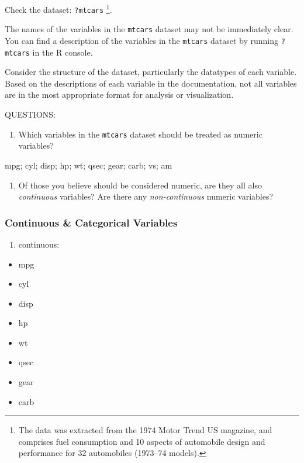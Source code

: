 \documentclass[
  man,
  floatsintext,
  longtable,
  nolmodern,
  notxfonts,
  notimes,
  colorlinks=true,linkcolor=blue,citecolor=blue,urlcolor=blue]{apa7}
\providecommand{\tightlist}{%
  \setlength{\itemsep}{0pt}\setlength{\parskip}{0pt}}
\begin{document}
Check the dataset: \texttt{?mtcars} \footnote{The data was extracted
  from the 1974 Motor Trend US magazine, and comprises fuel consumption
  and 10 aspects of automobile design and performance for 32 automobiles
  (1973--74 models).}.

The names of the variables in the \texttt{mtcars} dataset may not be
immediately clear. You can find a description of the variables in the
\texttt{mtcars} dataset by running \texttt{?mtcars} in the R console.

Consider the structure of the dataset, particularly the datatypes of
each variable. Based on the descriptions of each variable in the
documentation, not all variables are in the most appropriate format for
analysis or visualization.

QUESTIONS:

\begin{enumerate}
\def\labelenumi{\arabic{enumi}.}
\tightlist
\item
  Which variables in the \texttt{mtcars} dataset should be treated as
  numeric variables?
\end{enumerate}

mpg; cyl; disp; hp; wt; qsec; gear; carb; vs; am

\begin{enumerate}
\def\labelenumi{\arabic{enumi}.}
\setcounter{enumi}{1}
\tightlist
\item
  Of those you believe should be considered numeric, are they all also
  \emph{continuous} variables? Are there any \emph{non-continuous}
  numeric variables?
\end{enumerate}

\subsubsection{Continuous \& Categorical
Variables}\label{continuous-categorical-variables}

\begin{enumerate}
\def\labelenumi{\arabic{enumi}.}
\tightlist
\item
  continuous:
\end{enumerate}

\begin{itemize}
\tightlist
\item
  mpg
\item
  cyl
\item
  disp
\item
  hp
\item
  wt
\item
  qsec
\item
  gear
\item
  carb
\end{itemize}
\end{document}
